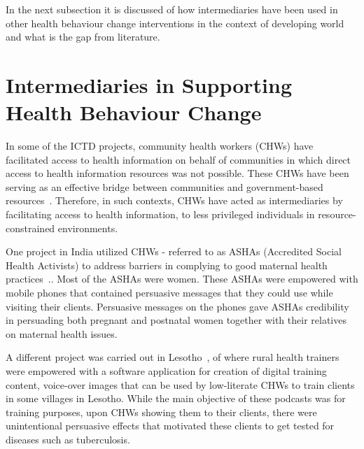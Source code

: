 In the next subsection it is discussed of how intermediaries have been used in other health behaviour change interventions in the context of developing world and what is the gap from literature.

\section{Intermediaries in Supporting Health Behaviour Change}
In some of the ICTD projects, community health workers (CHWs) have facilitated access to health information on behalf of communities in which direct access to health information resources was not possible. These CHWs have been serving as an effective bridge between communities and government-based resources~\citep{katule2016leveraging}. Therefore, in such contexts, CHWs have acted as intermediaries by facilitating access to health information, to less privileged individuals in resource-constrained environments.  

One project in India utilized CHWs - referred to as ASHAs (Accredited Social Health Activists) to address barriers in complying to good maternal health practices~\citep{ramachandran2010mobile,ramachandran2010research}.. Most of the ASHAs were women. These ASHAs were empowered with mobile phones that contained persuasive messages that they could use while visiting their clients. Persuasive messages on the phones gave ASHAs credibility in persuading both pregnant and postnatal women together with their relatives on maternal health issues. 

A different project was carried out in Lesotho~\citep{molapo2013software}, of where rural health trainers were empowered with a software application for creation of digital  training  content, voice-over images  that can be used by low-literate CHWs to train clients in some villages in Lesotho. While the main objective of these podcasts was for training purposes, upon CHWs showing them to their clients, there were unintentional persuasive effects that motivated these clients to get tested for diseases such as tuberculosis.

